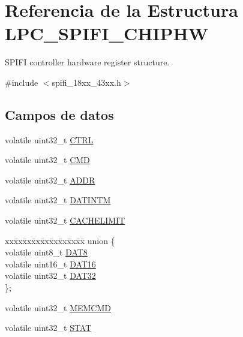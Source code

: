 \hypertarget{struct_l_p_c___s_p_i_f_i___c_h_i_p_h_w}{}\section{Referencia de la Estructura L\+P\+C\+\_\+\+S\+P\+I\+F\+I\+\_\+\+C\+H\+I\+P\+HW}
\label{struct_l_p_c___s_p_i_f_i___c_h_i_p_h_w}


S\+P\+I\+FI controller hardware register structure.  




{\ttfamily \#include $<$spifi\+\_\+18xx\+\_\+43xx.\+h$>$}

\subsection*{Campos de datos}
\begin{DoxyCompactItemize}
\item 
volatile uint32\+\_\+t \hyperlink{struct_l_p_c___s_p_i_f_i___c_h_i_p_h_w_acc539c9ddc2ca217f7977155acbead90}{C\+T\+RL}
\item 
volatile uint32\+\_\+t \hyperlink{struct_l_p_c___s_p_i_f_i___c_h_i_p_h_w_a4e290faccf19d747f3cc7ad223da366e}{C\+MD}
\item 
volatile uint32\+\_\+t \hyperlink{struct_l_p_c___s_p_i_f_i___c_h_i_p_h_w_a01cf153f44f32eb541425633d6c3d3e4}{A\+D\+DR}
\item 
volatile uint32\+\_\+t \hyperlink{struct_l_p_c___s_p_i_f_i___c_h_i_p_h_w_a614fb7760bd8116f2e4e1f768d0863cb}{D\+A\+T\+I\+N\+TM}
\item 
volatile uint32\+\_\+t \hyperlink{struct_l_p_c___s_p_i_f_i___c_h_i_p_h_w_a74f7289f74c9a4529929e9ccbf0197d0}{C\+A\+C\+H\+E\+L\+I\+M\+IT}
\item 
\begin{tabbing}
xx\=xx\=xx\=xx\=xx\=xx\=xx\=xx\=xx\=\kill
union \{\\
\>volatile uint8\_t \hyperlink{struct_l_p_c___s_p_i_f_i___c_h_i_p_h_w_ada5a1d7176cbf6c6428cc74bb5e3e4c5}{DAT8}\\
\>volatile uint16\_t \hyperlink{struct_l_p_c___s_p_i_f_i___c_h_i_p_h_w_a5190579c5c09890c1714a00a9e984b73}{DAT16}\\
\>volatile uint32\_t \hyperlink{struct_l_p_c___s_p_i_f_i___c_h_i_p_h_w_a47d3b0caad175a985ddcaff5b9189214}{DAT32}\\
\}; \\

\end{tabbing}\item 
volatile uint32\+\_\+t \hyperlink{struct_l_p_c___s_p_i_f_i___c_h_i_p_h_w_a3be351d2b90c79bc0e1a327bb35b8d6c}{M\+E\+M\+C\+MD}
\item 
volatile uint32\+\_\+t \hyperlink{struct_l_p_c___s_p_i_f_i___c_h_i_p_h_w_a600a8724a82efe4028e2b4fd3e8e61fe}{S\+T\+AT}
\end{DoxyCompactItemize}


